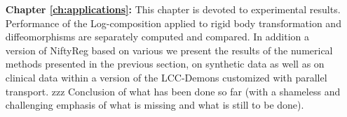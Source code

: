 \begin{enumerate}
	\item[{\bf Chapter \ref{ch:applications}:}] This chapter is devoted to experimental results. Performance of the Log-composition applied to rigid body transformation and diffeomorphisms are separately computed and compared. In addition a version of NiftyReg based on various we present the results of the numerical methods presented in the previous section, on synthetic data as well as on clinical data within a version of the  LCC-Demons customized with parallel transport.
	zzz Conclusion of what has been done so far (with a shameless and challenging emphasis of what is missing and what is still to be done).

	
	
\end{enumerate}








